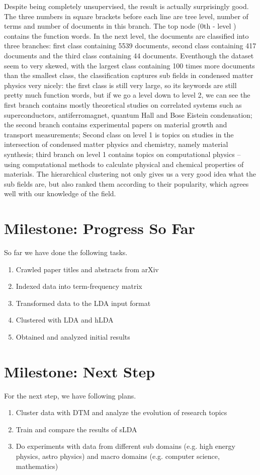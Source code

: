 \documentclass[DIV=calc, paper=a4, fontsize=11pt, twocolumn]{scrartcl}	 %
\begin{document}
Despite being completely unsupervised, the result is actually surprisingly good. The three numbers in square brackets before each line are tree level, number of terms and number of documents in this branch. The top node (0th - level ) contains the function words. In the next level, the documents are classified into three branches: first class containing 5539 documents, second class containing 417 documents and the third class containing 44 documents. Eventhough the dataset seem to very skewed, with the largest class containing 100 times more documents than the smallest class, the classification captures sub fields in condensed matter physics very nicely: the first class is still very large, so its keywords are still pretty much function words, but if we go a level down to level 2, we can see the first branch contains mostly theoretical studies on correlated systems such as superconductors, antiferromagnet, quantum Hall and Bose Eistein condensation; the second branch contains experimental papers on material growth and transport measurements; Second class on level 1 is topics on studies in the intersection of condensed matter physics and chemistry, namely material synthesis; third branch on level 1 contains topics on computational physics -- using computational methods to calculate physical and chemical properties of materials. The hierarchical clustering not only gives us a very good idea what the sub fields are, but also ranked them according to their popularity, which agrees well with our knowledge of the field.      

\section*{Milestone: Progress So Far}
So far we have done the following tasks.
\begin{enumerate}
\item Crawled paper titles and abstracts from arXiv
\item Indexed data into term-frequency matrix
\item Transformed data to the LDA input format
\item Clustered with LDA and hLDA
\item Obtained and analyzed initial results
\end{enumerate}

\section*{Milestone: Next Step}
For the next step, we have following plans.
\begin{enumerate}
\item Cluster data with DTM and analyze the evolution of research topics
\item Train and compare the results of sLDA
\item Do experiments with data from different sub domains (e.g. high energy physics, astro physics) and macro domains (e.g. computer science, mathematics)
\end{enumerate}
\end{document}
